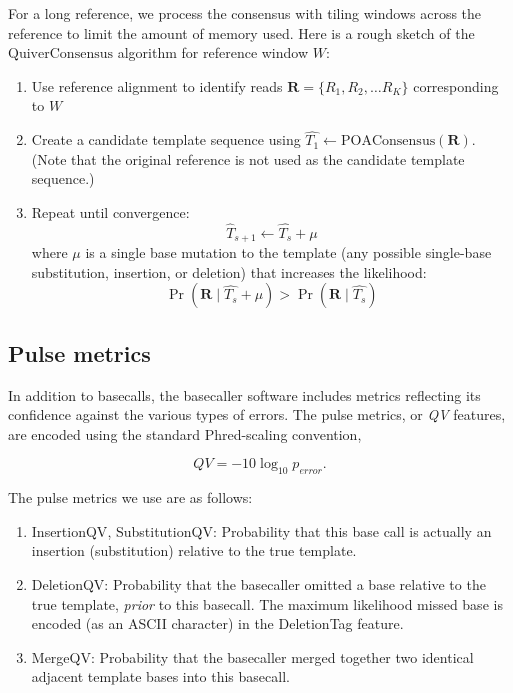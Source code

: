 \documentclass[11pt]{article}
\begin{document}
For a long reference, we process the consensus with tiling windows across the reference to limit the amount of memory used. Here is a rough sketch of the $\mathrm{QuiverConsensus}$ algorithm for reference window $W$:\begin{enumerate}
   \item Use reference alignment to identify reads $\mathbf{R}=\{R_1, R_2, \ldots R_K\}$ corresponding to $W$
   \item Create a candidate template sequence using $\hat{T_1} \leftarrow \mathrm{POAConsensus}(\mathbf{R})$. (Note that the original reference is not used as the candidate template sequence.)
   \item Repeat until convergence: $$\hat{T}_{s+1} \leftarrow \hat{T_{s}} + \mu$$ where $\mu$ is a single base mutation to the template (any possible single-base substitution, insertion, or deletion) that increases the likelihood:
     $$\Pr(\mathbf{R} \mid \hat{T_s} + \mu) > \Pr(\mathbf{R} \mid \hat{T_s})$$

\end{enumerate}

\subsection{Pulse metrics}

In addition to basecalls, the basecaller software includes metrics
reflecting its confidence against the various types of errors.  The
pulse metrics, or \emph{QV} features, are encoded using the standard
Phred-scaling convention,

$$QV = -10 \log_{10} p_{error}.$$

The pulse metrics we use are as follows:
\begin{enumerate}
   \item \textsf{InsertionQV}, \textsf{SubstitutionQV}: Probability
     that this base call is actually an insertion (substitution)
     relative to the true template.
   \item \textsf{DeletionQV}: Probability that the basecaller omitted
     a base relative to the true template, \emph{prior} to this
     basecall.  The maximum likelihood missed base is encoded (as an
     ASCII character) in the \textsf{DeletionTag} feature.
   \item \textsf{MergeQV}: Probability that the basecaller merged
     together two identical adjacent template bases into this
     basecall.
\end{enumerate}
\end{document}
